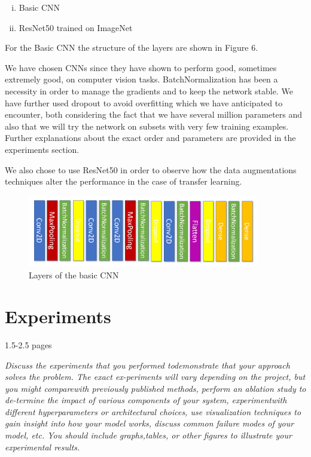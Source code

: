 \documentclass{article}
\begin{document}
\begin{enumerate}[(i)]
 \item Basic CNN
 \item ResNet50 trained on ImageNet
\end{enumerate}

For the Basic CNN the structure of the layers are shown in Figure 6.

We have chosen CNNs since they have shown to perform good, sometimes extremely good, on computer vision tasks. BatchNormalization has been a necessity in order to manage the gradients and to keep the network stable. We have further used dropout to avoid overfitting which we have anticipated to encounter, both considering the fact that we have several million parameters and also that we will try the network on subsets with very few training examples. Further explanations about the exact order and parameters are provided in the experiments section.

We also chose to use ResNet50 in order to observe how the data augmentations techniques alter the performance in the case of transfer learning.

\begin{figure}[H]
	\centering
	\includegraphics[width=0.9\textwidth]{conv.PNG}
	\caption{Layers of the basic CNN}
\end{figure}

\section{Experiments}

1.5-2.5 pages

\textit{Discuss the experiments that you performed todemonstrate  that  your  approach  solves  the  problem.   The  exact  ex-periments will vary depending on the project, but you might comparewith previously published methods, perform an ablation study to de-termine the impact of various components of your system, experimentwith different hyperparameters or architectural choices, use visualization  techniques  to  gain  insight  into  how  your  model  works,  discuss common failure modes of your model, etc.  You should include graphs,tables, or other figures to illustrate your experimental results.}	
\end{document}
